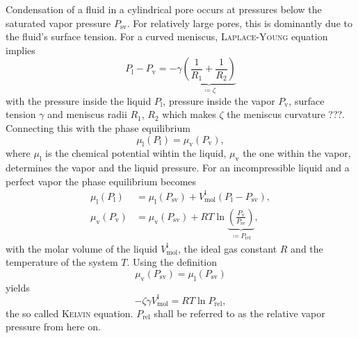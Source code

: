 \documentclass[../thesis.tex]{subfiles}
\begin{document}
      Condensation of a fluid in a cylindrical pore occurs at pressures below the saturated vapor pressure $P_\mathrm{sv}$. For relatively large pores, this is dominantly due to the fluid's surface tension. For a curved meniscus, \textsc{Laplace-Young} equation implies
      \begin{equation*}
        P_\mathrm{l}-P_\mathrm{v}=-\gamma\underbrace{\left(\frac{1}{R_1}+\frac{1}{R_2}\right)}_{\coloneqq\zeta}
      \end{equation*}
      with the pressure inside the liquid $P_\mathrm{l}$, pressure inside the vapor $P_\mathrm{v}$, surface tension $\gamma$ and meniscus radii $R_1$, $R_2$ which makes $\zeta$ the meniscus curvature ???.
      Connecting this with the phase equilibrium
      \begin{equation*}
        \mu_\mathrm{l}(P_\mathrm{l})=\mu_\mathrm{v}(P_\mathrm{v}),
      \end{equation*}
      where $\mu_\mathrm{l}$ is the chemical potential wihtin the liquid, $\mu_\mathrm{v}$ the one within the vapor, determines the vapor and the liquid pressure. For an incompressible liquid and a perfect vapor the phase equilibrium becomes
      \begin{align*}
        \mu_\mathrm{l}(P_\mathrm{l}) &= \mu_\mathrm{l}(P_\mathrm{sv})+V_\mathrm{mol}^\mathrm{l}(P_\mathrm{l}-P_\mathrm{sv}),  \\
        \mu_\mathrm{v}(P_\mathrm{v}) &= \mu_\mathrm{v}(P_\mathrm{sv})+RT\ln\underbrace{\left( \frac{P_\mathrm{v}}{P_\mathrm{sv}}\right)}_{\coloneqq P_\mathrm{rel}},
      \end{align*}
      with the molar volume of the liquid $V_\mathrm{mol}^\mathrm{l}$, the ideal gas constant $R$ and the temperature of the system $T$. Using the definition
      \begin{equation*}
        \mu_\mathrm{v}(P_\mathrm{sv})=\mu_\mathrm{l}(P_\mathrm{sv})
      \end{equation*}
      yields
      \begin{equation}
        -\zeta\gamma V_\mathrm{mol}^\mathrm{l}= RT\ln P_\mathrm{rel},
      \end{equation}
      the so called \textsc{Kelvin} equation. $P_\mathrm{rel}$ shall be referred to as the relative vapor pressure from here on.
      \medskip

      
\end{document}
